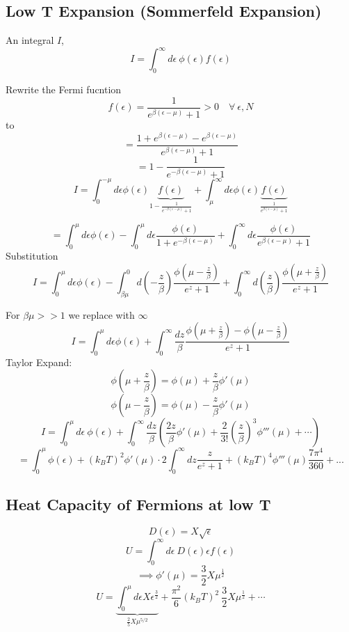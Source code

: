 \documentclass[11pt]{book}
\theoremstyle{definition}
\begin{document}
\subsection{Low T Expansion (Sommerfeld Expansion)}
An integral $ I $,
\[ I = \int_0^{\infty} d \epsilon \: \phi(\epsilon) f(\epsilon) \] 

Rewrite the Fermi fucntion
\[ f(\epsilon) = \frac{1}{e^{\beta(\epsilon-\mu)}+1} > 0 \quad \forall \: \epsilon,N\] 
to
\[ = \frac{1+ e^{\beta (\epsilon -\mu)}-e^{\beta (\epsilon -\mu)}}{e^{\beta( \epsilon - \mu )}+1} \] 
\[  = 1 - \frac{1}{e^{-\beta(\epsilon-\mu)}+1} \] 
\[ I = \int_0^{-\mu} d \epsilon \phi(\epsilon) 
\underbrace{f(\epsilon)}_{1-\frac{1}{e^{-\beta(\epsilon-\mu)}+1}} 
+ \int_{\mu}^{\infty} d \epsilon \phi(\epsilon) 
\underbrace{f(\epsilon)}_{\frac{1}{e^{\beta(\epsilon-\mu)}+1}} \] 

\[  = \int_0^{\mu} d \epsilon \phi( \epsilon ) - \int_0^{\mu} d \epsilon \frac{\phi(\epsilon)}{1 + e^{-\beta(\epsilon-\mu)}} + \int_0^{\infty} d \epsilon \frac{ \phi(\epsilon) }{e^{\beta(\epsilon-\mu)}+1}\] 
Substitution
\[ I = \int_0^{\mu} d \epsilon \phi(\epsilon) - \int_{\beta \mu}^0 d \left( -\frac{z}{\beta} \right) \frac{\phi(\mu - \frac{z}{\beta})}{e^{z} + 1} + \int_0^{\infty} d \left( \frac{z}{\beta} \right) \frac{\phi(\mu + \frac{z}{\beta})}{e^{z}+1}  \] 

For $ \beta \mu >> 1 $ we replace with $ \infty $ 
\[ I = \int_0^{\mu} d \epsilon \phi( \epsilon ) + \int_0^{\infty} \frac{dz}{\beta} \frac{\phi(\mu+ \frac{z}{\beta})- \phi(\mu- \frac{z}{\beta})}{e^{z}+1}  \] 
Taylor Expand:
\[ \phi(\mu + \frac{z}{\beta}) = \phi(\mu) + \frac{z}{\beta}\phi'(\mu) \] 
\[ \phi(\mu - \frac{z}{\beta}) = \phi(\mu) - \frac{z}{\beta}\phi'(\mu) \] 
\[ I = \int_0^{\mu} d \epsilon \: \phi(\epsilon) + \int_0^{\infty} \frac{dz}{\beta} \left( \frac{2z}{\beta} \phi'(\mu) + \frac{2}{3!}\left( \frac{z}{\beta} \right)^{3} \phi'''(\mu) + \cdots \right)  \] 
\[ = \int_0^{\mu} \phi(\epsilon) + (k_BT)^2 \phi'(\mu) \cdot 2 \int_0^{\infty} dz \frac{z}{e^{z}+1} + (k_BT)^4 \phi'''(\mu) \frac{7\pi^4}{360} + ...\] 


\subsection{Heat Capacity of Fermions at low T}
\[ D(\epsilon) = X\sqrt{\epsilon} \] 
\[ U = \int_0^{\infty} d \epsilon \: D(\epsilon) \epsilon f(\epsilon) \] 
\[ \implies \phi'(\mu) = \frac{3}{2}X \mu^{\frac{1}{2}} \] 
\[ U = \underbrace{\int_0^{\mu} d \epsilon X \epsilon^{\frac{3}{2}}}_{\frac{2}{5}X \mu^{5/2}} + \frac{\pi^2}{6} (k_BT)^2 \: \frac{3}{2} X \mu^{ \frac{1}{2} } + \cdots \] 
\end{document}
